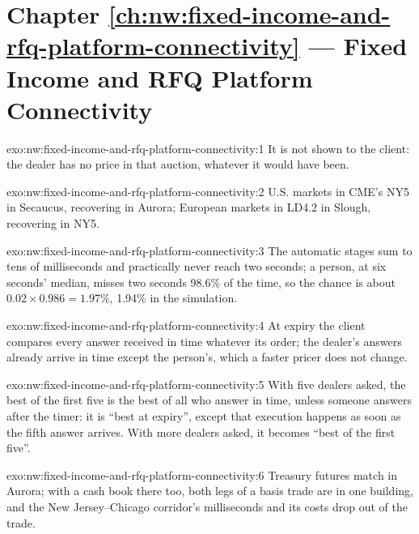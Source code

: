 \section*{Chapter \ref{ch:nw:fixed-income-and-rfq-platform-connectivity} --- Fixed Income and RFQ Platform Connectivity}

\begin{solution}{exo:nw:fixed-income-and-rfq-platform-connectivity:1}
It is not shown to the client: the dealer has no price in that auction, whatever it would have been.
\end{solution}

\begin{solution}{exo:nw:fixed-income-and-rfq-platform-connectivity:2}
U.S. markets in CME's NY5 in Secaucus, recovering in Aurora; European markets in LD4.2 in Slough, recovering in NY5.
\end{solution}

\begin{solution}{exo:nw:fixed-income-and-rfq-platform-connectivity:3}
The automatic stages sum to tens of milliseconds and practically never reach two seconds; a person, at six seconds' median, misses
two seconds 98.6\% of the time, so the chance is about $0.02 \times 0.986 = 1.97\%$, 1.94\% in the simulation.
\end{solution}

\begin{solution}{exo:nw:fixed-income-and-rfq-platform-connectivity:4}
At expiry the client compares every answer received in time whatever its order; the dealer's answers already arrive in time except
the person's, which a faster pricer does not change.
\end{solution}

\begin{solution}{exo:nw:fixed-income-and-rfq-platform-connectivity:5}
With five dealers asked, the best of the first five is the best of all who answer in time, unless someone answers after the timer: it is
``best at expiry'', except that execution happens as soon as the fifth answer arrives. With more dealers asked, it becomes ``best of the
first five''.
\end{solution}

\begin{solution}{exo:nw:fixed-income-and-rfq-platform-connectivity:6}
Treasury futures match in Aurora; with a cash book there too, both legs of a basis trade are in one building, and the New Jersey--Chicago
corridor's milliseconds and its costs drop out of the trade.
\end{solution}

